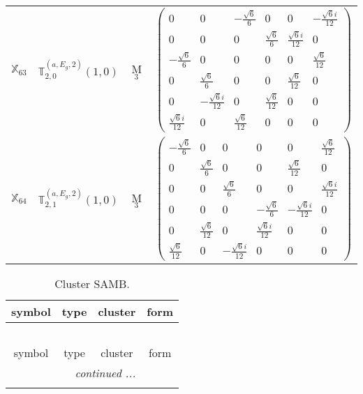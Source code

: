 \documentclass[fleqn,10pt,landscape]{article}
\begin{document}
\begin{itemize}
\begin{center}
\begin{longtable}{c|c|c|c}
$ \mathbb{X}_{63} $ & $\mathbb{T}_{2,0}^{(a,E_{g},2)}(1,0)$ & M$_{3}$ & $\begin{pmatrix} 0 & 0 & - \frac{\sqrt{6}}{6} & 0 & 0 & - \frac{\sqrt{6} i}{12} \\ 0 & 0 & 0 & \frac{\sqrt{6}}{6} & \frac{\sqrt{6} i}{12} & 0 \\ - \frac{\sqrt{6}}{6} & 0 & 0 & 0 & 0 & \frac{\sqrt{6}}{12} \\ 0 & \frac{\sqrt{6}}{6} & 0 & 0 & \frac{\sqrt{6}}{12} & 0 \\ 0 & - \frac{\sqrt{6} i}{12} & 0 & \frac{\sqrt{6}}{12} & 0 & 0 \\ \frac{\sqrt{6} i}{12} & 0 & \frac{\sqrt{6}}{12} & 0 & 0 & 0 \end{pmatrix}$ \\
$ \mathbb{X}_{64} $ & $\mathbb{T}_{2,1}^{(a,E_{g},2)}(1,0)$ & M$_{3}$ & $\begin{pmatrix} - \frac{\sqrt{6}}{6} & 0 & 0 & 0 & 0 & \frac{\sqrt{6}}{12} \\ 0 & \frac{\sqrt{6}}{6} & 0 & 0 & \frac{\sqrt{6}}{12} & 0 \\ 0 & 0 & \frac{\sqrt{6}}{6} & 0 & 0 & \frac{\sqrt{6} i}{12} \\ 0 & 0 & 0 & - \frac{\sqrt{6}}{6} & - \frac{\sqrt{6} i}{12} & 0 \\ 0 & \frac{\sqrt{6}}{12} & 0 & \frac{\sqrt{6} i}{12} & 0 & 0 \\ \frac{\sqrt{6}}{12} & 0 & - \frac{\sqrt{6} i}{12} & 0 & 0 & 0 \end{pmatrix}$ \\
\end{longtable}
\end{center}
\begin{center}
\renewcommand{\arraystretch}{1.3}
\begin{longtable}{c|c|c|c}
\caption{Cluster SAMB.}
 \\
 \hline \hline
symbol & type & cluster & form \\ \hline \endfirsthead

\multicolumn{3}{l}{\tablename\ \thetable{}} \\
 \hline \hline
symbol & type & cluster & form \\ \hline \endhead

 \hline \hline
\multicolumn{3}{r}{\footnotesize\it continued ...} \\ \endfoot


\end{longtable}
\end{center}
\end{itemize}
\end{document}
